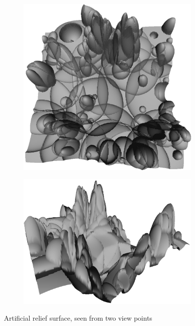 \begin{figure}[H]
\centering
\begin{subfigure}{.5\textwidth}
\includegraphics[width=\linewidth]{fig/r1_render2.jpg}
\end{subfigure}%
\begin{subfigure}{.5\textwidth}
\includegraphics[width=\linewidth]{fig/r1_render1.jpg}
\end{subfigure}
\caption{Artificial relief surface, seen from two view points}
\label{fig:relief_render}
\end{figure}

